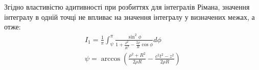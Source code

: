 Згідно властивістю адитивності при розбиттях для інтегралів Рімана, 
значення інтегралу в одній точці не впливає на значення інтегралу у 
визначених межах, а отже:
%
\begin{equation*} \begin{aligned}
I_1 = \frac{1}{\pi} \int_{\psi}^{\pi}
\frac{\sin^2{\phi}}{1 + \frac{\rho^2}{R^2} - 
\frac{2 \rho}{R} \cos \phi} d \phi \\
\psi = \arccos \left( \frac{\rho^2 + R^2}{2 \rho R} - 
\frac{c^2 t^2 - z^2}{2 \rho R} \right)
\end{aligned} \end{equation*}
%
%
